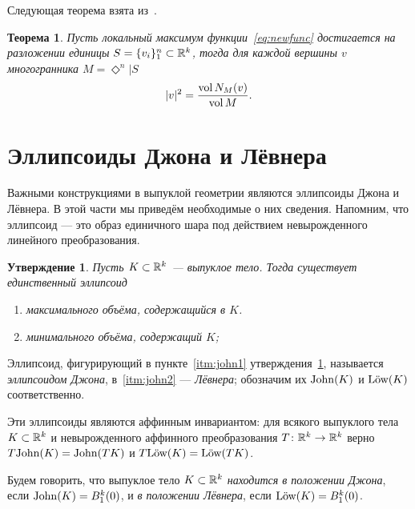 \documentclass[a4paper,12pt]{article}
\def\vol{\mathop{\rm vol}}
\def\low{\text{\rm L\"ow}}
\def\john{\mathbf{\rm John}}
\newcommand{\crosp}{\Diamond}
\newcommand{\lb}[1]{#1\nobreak\discretionary{}{\hbox{\ensuremath{#1}}}{}}
\newtheorem{prop}{Утверждение}[section]
\newtheorem{theorem}{Теорема}[section]
\numberwithin{equation}{section}
\begin{document}
	Следующая теорема взята из~\cite{crospol}.
	\begin{theorem}\label{theorem:nescon}
		Пусть локальный максимум функции~\eqref{eq:newfunc} достигается на разложении единицы $S=\{v_i\}_1^n\subset\mathbb {R}^k$, тогда для каждой вершины $v$ многогранника $M=\crosp^n|S$
			$$|v|^2=\frac{\vol N_M(v)}{\vol M}.$$
	\end{theorem}

	\section{Эллипсоиды Джона и Лёвнера}
	Важными конструкциями в выпуклой геометрии являются эллипсоиды Джона и Лёвнера. В этой части мы приведём необходимые о них сведения. 
	Напомним, что эллипсоид --- это образ единичного шара под действием невырожденного линейного преобразования.
	\begin{prop}\label{prop:johnlow}
		Пусть $K\subset\mathbb {R}^k$ --- выпуклое тело. Тогда существует единственный эллипсоид
			\begin{enumerate}[label=\textnormal{(\arabic*)}]
				\item максимального объёма, содержащийся в $K$.\label{itm:john1}
				\item минимального объёма, содержащий $K$;\label{itm:john2}
			\end{enumerate}
	\end{prop}
	Эллипсоид, фигурирующий в пункте~\ref{itm:john1} утверждения~\ref{prop:johnlow}, называется \textit{эллипсоидом Джона}, в~\ref{itm:john2} --- \textit{Лёвнера}; обозначим их $\john(K)$ и $\low(K)$ соответственно.

	Эти эллипсоиды являются аффинным инвариантом: для всякого выпуклого тела~$K\subset\mathbb {R}^k$ и невырожденного аффинного преобразования $T\colon\mathbb {R}^k\to\mathbb {R}^k$ верно $T\john(K)\lb=\john(TK)$ и $T\low(K)=\low(TK)$.

	Будем говорить, что выпуклое тело $K\subset\mathbb {R}^k$ \textit{находится в положении Джона}, если $\john(K)=B^k_1(0)$, и \textit{в положении Лёвнера}, если $\low(K)=B^k_1(0)$.
\end{document}
